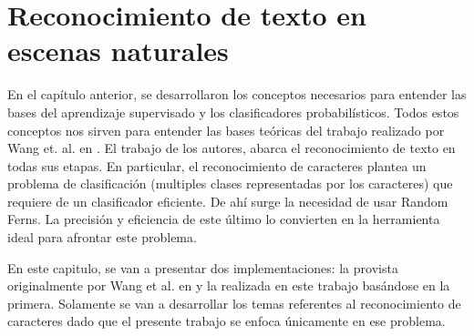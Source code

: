 \newpage	
\section{Reconocimiento de texto en escenas naturales}

	En el capítulo anterior, se desarrollaron los conceptos necesarios para entender las bases del aprendizaje supervisado y los clasificadores probabilísticos. Todos estos conceptos nos sirven para entender las bases teóricas del trabajo realizado por Wang et. al. en \cite{wang}. El trabajo de los autores, abarca el reconocimiento de texto en todas sus etapas. En particular, el reconocimiento de caracteres plantea un problema de clasificación (multiples clases representadas por los caracteres) que requiere de un clasificador eficiente. De ahí surge la necesidad de usar Random Ferns. La precisión y eficiencia de este último lo convierten en la herramienta ideal para afrontar este problema.
	
	En este capitulo, se van a presentar dos implementaciones: la provista originalmente por Wang et al. en \cite{wang} y la realizada en este trabajo basándose en la primera. Solamente se van a desarrollar los temas referentes al reconocimiento de caracteres dado que el presente trabajo se enfoca únicamente en ese problema.
	
		
	
	
	
	
	
